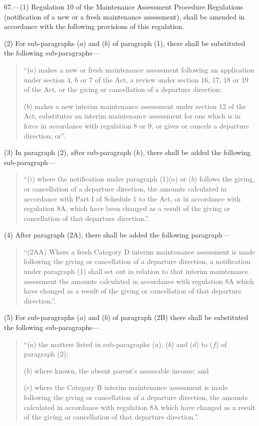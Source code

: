 \documentclass[12pt,a4paper]{article}
\begin{document}
67.—(1) Regulation 10 of the Maintenance Assessment Procedure
Regulations (notification of a new or a fresh maintenance assessment), shall be
amended in accordance with the following provisions of this regulation.

(2) For sub-paragraphs ($a$) and ($b$) of paragraph (1), there shall be substituted
the following sub-paragraphs—
\begin{quotation}
“($a$) makes a new or fresh maintenance assessment following an application under
section 4, 6 or 7 of the Act, a review under section 16, 17, 18 or 19 of the
Act, or the giving or cancellation of a departure direction;

($b$) makes a new interim maintenance assessment under section 12 of the Act,
substitutes an interim maintenance assessment for one which is in force in
accordance with regulation 8 or 9, or gives or cancels a departure direction;
or”.
\end{quotation}

(3) In paragraph (2), after sub-paragraph ($h$), there shall be added the
following sub-paragraph—
\begin{quotation}
“($i$) where the notification under paragraph (1)($a$) or ($b$) follows the giving, or
cancellation of a departure direction, the amounts calculated in accordance with
Part I of Schedule 1 to the Act, or in accordance with regulation 8A, which have
been changed as a result of the giving or cancellation of that departure
direction.”.
\end{quotation}

(4) After paragraph (2A), there shall be added the following paragraph—
\begin{quotation}
“(2AA) Where a fresh Category D interim maintenance assessment is made following
the giving or cancellation of a departure direction, a notification under
paragraph (1) shall set out in relation to that interim maintenance assessment
the amounts calculated in accordance with regulation 8A which have changed as a
result of the giving or cancellation of that departure direction.”.
\end{quotation}

(5) For sub-paragraphs ($a$) and ($b$) of paragraph (2B) there shall be substituted
the following sub-paragraphs—
\begin{quotation}
“($a$) the matters listed in sub-paragraphs ($a$), ($b$) and ($d$) to ($f$) of paragraph
(2);

($b$) where known, the absent parent’s assessable income; and

($c$) where the Category B interim maintenance assessment is made following the
giving or cancellation of a departure direction, the amounts calculated in
accordance with regulation 8A which have changed as a result of the giving or
cancellation of that departure direction.”.
\end{quotation}
\end{document}
